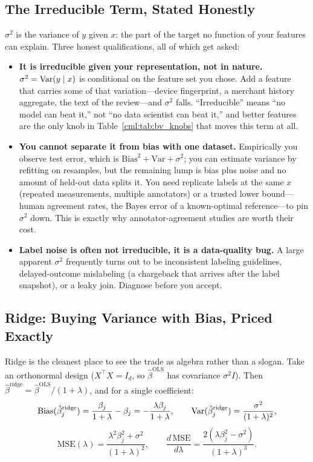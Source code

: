 \subsection{The Irreducible Term, Stated Honestly}

$\sigma^2$ is the variance of $y$ given $x$: the part of the target no function of your features can explain. Three honest qualifications, all of which get asked:

\begin{itemize}
    \item \textbf{It is irreducible given your representation, not in nature.} $\sigma^2 = \operatorname{Var}(y \mid x)$ is conditional on the feature set you chose. Add a feature that carries some of that variation---device fingerprint, a merchant history aggregate, the text of the review---and $\sigma^2$ falls. ``Irreducible'' means ``no model can beat it,'' not ``no data scientist can beat it,'' and better features are the only knob in Table~\ref{cml:tab:bv_knobs} that moves this term at all.
    \item \textbf{You cannot separate it from bias with one dataset.} Empirically you observe test error, which is $\text{Bias}^2 + \text{Var} + \sigma^2$; you can estimate variance by refitting on resamples, but the remaining lump is bias plus noise and no amount of held-out data splits it. You need replicate labels at the same $x$ (repeated measurements, multiple annotators) or a trusted lower bound---human agreement rates, the Bayes error of a known-optimal reference---to pin $\sigma^2$ down. This is exactly why annotator-agreement studies are worth their cost.
    \item \textbf{Label noise is often not irreducible, it is a data-quality bug.} A large apparent $\sigma^2$ frequently turns out to be inconsistent labeling guidelines, delayed-outcome mislabeling (a chargeback that arrives after the label snapshot), or a leaky join. Diagnose before you accept.
\end{itemize}

\subsection{Ridge: Buying Variance with Bias, Priced Exactly}

Ridge is the cleanest place to see the trade as algebra rather than a slogan. Take an orthonormal design ($X^\top X = I_d$, so $\hat\beta^{\text{OLS}}$ has covariance $\sigma^2 I$). Then $\hat\beta^{\text{ridge}} = \hat\beta^{\text{OLS}}/(1+\lambda)$, and for a single coefficient:
\begin{equation}
\text{Bias}(\hat\beta_j^{\text{ridge}}) = \frac{\beta_j}{1+\lambda} - \beta_j = -\frac{\lambda\beta_j}{1+\lambda}, \qquad
\operatorname{Var}(\hat\beta_j^{\text{ridge}}) = \frac{\sigma^2}{(1+\lambda)^2},
\end{equation}
\begin{equation}
\text{MSE}(\lambda) = \frac{\lambda^2\beta_j^2 + \sigma^2}{(1+\lambda)^2}, \qquad
\frac{d\,\text{MSE}}{d\lambda} = \frac{2(\lambda\beta_j^2 - \sigma^2)}{(1+\lambda)^3} .
\end{equation}

